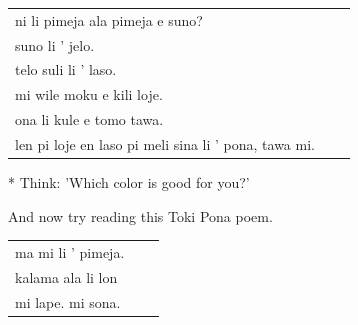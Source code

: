 \begin{supertabular}{p{5,5cm}|ll}
    ni li pimeja ala pimeja e suno?                      &  & \\
    suno li ' jelo.                                      &  & \\
    telo suli li ' laso.                                 &  & \\
    mi wile moku e kili loje.                            &  & \\
    ona li kule e tomo tawa.                             &  & \\
    len pi loje en laso pi meli sina li ' pona, tawa mi. &  & \\
\end{supertabular}

* Think: 'Which color is good for you?'

And now try reading this Toki Pona poem.

\begin{supertabular}{p{5,5cm}|ll}
    ma mi li ' pimeja. &  & \\
    kalama ala li lon  &  & \\
    mi lape. mi sona.  &  & \\
\end{supertabular}
